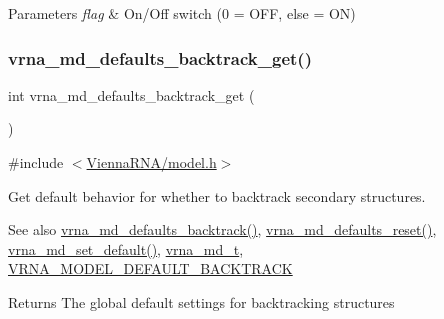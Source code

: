 \begin{DoxyParams}{Parameters}
{\em flag} & On/\+Off switch (0 = O\+FF, else = ON) \\
\hline
\end{DoxyParams}
\mbox{\label{group__model__details_ga90da1156e6883ddd68527c2830706648}} 
\subsubsection{\texorpdfstring{vrna\+\_\+md\+\_\+defaults\+\_\+backtrack\+\_\+get()}{vrna\_md\_defaults\_backtrack\_get()}}
{\footnotesize\ttfamily int vrna\+\_\+md\+\_\+defaults\+\_\+backtrack\+\_\+get (\begin{DoxyParamCaption}\item[{void}]{ }\end{DoxyParamCaption})}



{\ttfamily \#include $<$\mbox{\hyperlink{model_8h}{Vienna\+R\+N\+A/model.\+h}}$>$}



Get default behavior for whether to backtrack secondary structures. 

\begin{DoxySeeAlso}{See also}
\mbox{\hyperlink{group__model__details_ga978c468b2fe96a70d5191e3dd17d5599}{vrna\+\_\+md\+\_\+defaults\+\_\+backtrack()}}, \mbox{\hyperlink{group__model__details_ga70834424cf804d149937de89f80ceb45}{vrna\+\_\+md\+\_\+defaults\+\_\+reset()}}, \mbox{\hyperlink{group__model__details_ga8ac6ff84936282436f822644bf841f66}{vrna\+\_\+md\+\_\+set\+\_\+default()}}, \mbox{\hyperlink{group__model__details_ga1f8a10e12a0a1915f2a4eff0b28ea17c}{vrna\+\_\+md\+\_\+t}}, \mbox{\hyperlink{group__model__details_ga3fda8006ab84baf817bd8e5ccbc6bb35}{V\+R\+N\+A\+\_\+\+M\+O\+D\+E\+L\+\_\+\+D\+E\+F\+A\+U\+L\+T\+\_\+\+B\+A\+C\+K\+T\+R\+A\+CK}} 
\end{DoxySeeAlso}
\begin{DoxyReturn}{Returns}
The global default settings for backtracking structures 
\end{DoxyReturn}
\mbox{\label{group__model__details_ga68305274de96b56b7799575e222560d8}} 
